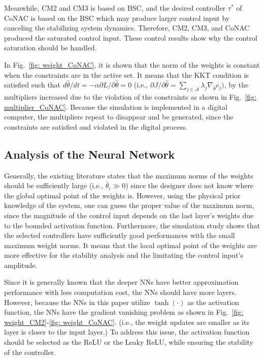 \documentclass[lettersize,journal]{IEEEtran}
\begin{document}
Meanwhile, CM2 and CM3 is based on BSC, and the desired controller $\tau^*$ of CoNAC is based on the BSC which may produce larger control input by canceling the stabilizing system dynamics.
Therefore, CM2, CM3, and CoNAC produced the saturated control input.
These control results show why the control saturation should be handled.

In Fig.~\ref{fig: weight_CoNAC}, it is shown that the norm of the weights is constant when the constraints are in the active set.
It means that the KKT condition is satisfied such that $d{\hat\theta}/dt=-\alpha\partial L/\partial \hat\theta=0$ (i.e., $\partial J/\partial\hat\theta = \sum_{j\in\mathcal {A}}\lambda_j\nabla_{\hat\theta} c_j)$, by the multipliers increased due to the violation of the constraints as shown in Fig.~\ref{fig: multiplier_CoNAC}.
Because the simulation is implemented in a digital computer, the multipliers repeat to disappear and be generated, since the constraints are satisfied and violated in the digital process.

\subsection{Analysis of the Neural Network}

Generally, the existing literature states that the maximum norms of the weights should be sufficiently large (i.e., $\bar\theta_i \gg 0$) since the designer does not know where the global optimal point of the weights is.
However, using the physical prior knowledge of the system, one can guess the proper value of the maximum norm, since the magnitude of the control input depends on the last layer's weights due to the bounded activation function.
Furthermore, the simulation study shows that the selected controllers have sufficiently good performances with the small maximum weight norms.
It means that the local optimal point of the weights are more effective for the stability analysis and the limitating the control input's amplitude.

Since it is generally known that the deeper NNs have better approximation performance with less computation cost, the NNs should have more layers.
However, because the NNs in this paper utilize $\tanh(\cdot)$ as the activation function, the NNs have the gradient vanishing problem as shown in Fig.~\ref{fig: weight_CM2}-\ref{fig: weight_CoNAC}. (i.e., the weight updates are smaller as its layer is closer to the input layer.)
To address this issue, the activation function should be selected as the ReLU or the Leaky ReLU, while ensuring the stability of the controller.
\end{document}
